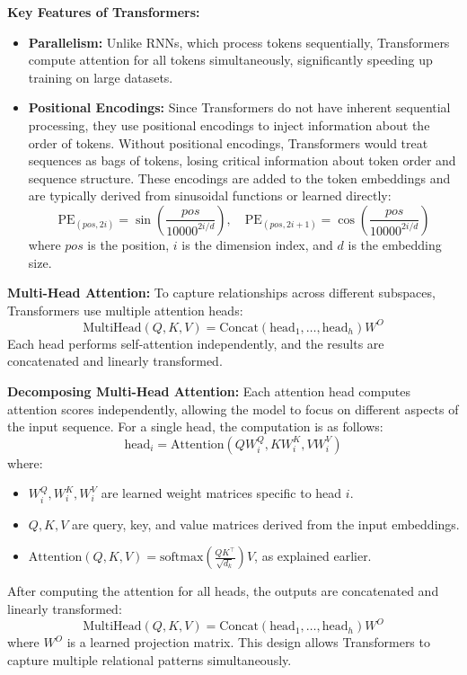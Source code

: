     \textbf{Key Features of Transformers:}
    \begin{itemize}
        \item \textbf{Parallelism:} Unlike RNNs, which process tokens sequentially, Transformers compute attention for all tokens simultaneously, significantly speeding up training on large datasets.
        \item \textbf{Positional Encodings:} Since Transformers do not have inherent sequential processing, they use positional encodings to inject information about the order of tokens. Without positional encodings, Transformers would treat sequences as bags of tokens, losing critical information about token order and sequence structure. These encodings are added to the token embeddings and are typically derived from sinusoidal functions or learned directly:
        \[
        \text{PE}_{(pos, 2i)} = \sin\left(\frac{pos}{10000^{2i/d}}\right), \quad
        \text{PE}_{(pos, 2i+1)} = \cos\left(\frac{pos}{10000^{2i/d}}\right)
        \]
        where \(pos\) is the position, \(i\) is the dimension index, and \(d\) is the embedding size.
    \end{itemize}

    \textbf{Multi-Head Attention:} To capture relationships across different subspaces, Transformers use multiple attention heads:
    \[
    \text{MultiHead}(Q, K, V) = \text{Concat}(\text{head}_1, \dots, \text{head}_h)W^O
    \]
    Each head performs self-attention independently, and the results are concatenated and linearly transformed. 

    \textbf{Decomposing Multi-Head Attention:}
    Each attention head computes attention scores independently, allowing the model to focus on different aspects of the input sequence. For a single head, the computation is as follows:
    \[
    \text{head}_i = \text{Attention}(QW_i^Q, KW_i^K, VW_i^V)
    \]
    where:
    \begin{itemize}
        \item \(W_i^Q, W_i^K, W_i^V\) are learned weight matrices specific to head \(i\).
        \item \(Q, K, V\) are query, key, and value matrices derived from the input embeddings.
        \item \(\text{Attention}(Q, K, V) = \text{softmax}\left(\frac{QK^\top}{\sqrt{d_k}}\right)V\), as explained earlier.
    \end{itemize}
    
    After computing the attention for all heads, the outputs are concatenated and linearly transformed:
    \[
    \text{MultiHead}(Q, K, V) = \text{Concat}(\text{head}_1, \dots, \text{head}_h)W^O
    \]
    where \(W^O\) is a learned projection matrix. This design allows Transformers to capture multiple relational patterns simultaneously. 

